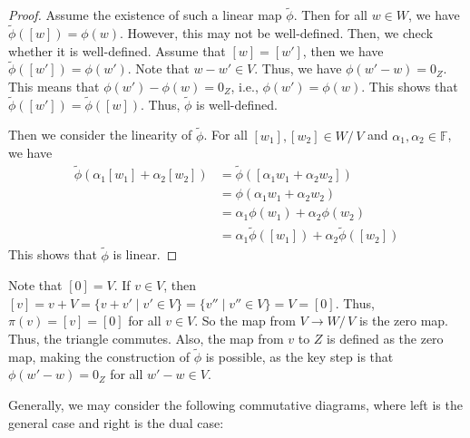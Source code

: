 \documentclass[
	11pt, %
	fleqn, %
	a4paper, %
]{LegrandOrangeBook}
\renewcommand{\ker}[1]{\mathsf{Ker}(#1)} %
\renewcommand{\Im}[1]{\mathsf{Im}(#1)} %
\newcommand{\quotient}[2]{#1/\, #2} %
\newcommand{\F}{\mathbb{F}} %
\newcommand{\coker}[1]{\mathsf{Coker}(#1)} %
\newcommand{\coim}[1]{\mathsf{Coim}(#1)} %
\begin{document}
\begin{proof}
    Assume the existence of such a linear map $\tilde{\phi}$. Then for all $w \in W$, we have $\tilde{\phi}([w]) = \phi(w)$. However, this may not be well-defined. Then, we check whether it is well-defined. Assume that $[w] = [w']$, then we have $\tilde{\phi}([w']) = \phi(w')$. Note that $w - w' \in V$. Thus, we have $\phi(w' - w) = 0_Z$. This means that $\phi(w') - \phi(w) = 0_Z$, i.e., $\phi(w') = \phi(w)$. This shows that $\tilde{\phi}([w']) = \tilde{\phi}([w])$. Thus, $\tilde{\phi}$ is well-defined.

    Then we consider the linearity of $\tilde{\phi}$. For all $[w_1], [w_2] \in \quotient{W}{V}$ and $\alpha_1, \alpha_2 \in \F$, we have
    \[
        \begin{split}
            \tilde{\phi}(\alpha_1 [w_1] + \alpha_2 [w_2]) &= \tilde{\phi}([\alpha_1 w_1 + \alpha_2 w_2]) \\
            &= \phi(\alpha_1 w_1 + \alpha_2 w_2) \\
            &= \alpha_1 \phi(w_1) + \alpha_2 \phi(w_2) \\
            &= \alpha_1 \tilde{\phi}([w_1]) + \alpha_2 \tilde{\phi}([w_2])
        \end{split}
    \]
    This shows that $\tilde{\phi}$ is linear.
\end{proof}

\begin{remark}
    Note that $[0] = V$. If $v \in V$, then $[v] = v + V = \{v + v' \mid v' \in V\} = \{v'' \mid v'' \in V\} = V = [0]$. Thus, $\pi(v) = [v] = [0]$ for all $v \in V$. So the map from $V \to \quotient{W}{V}$ is the zero map. Thus, the triangle commutes. Also, the map from $v$ to $Z$ is defined as the zero map, making the construction of $\tilde{\phi}$ is possible, as the key step is that $\phi(w' - w) = 0_Z$ for all $w' - w \in V$.
\end{remark}

Generally, we may consider the following commutative diagrams, where left is the general case and right is the dual case:

\begin{center}
\end{center}
\end{document}

